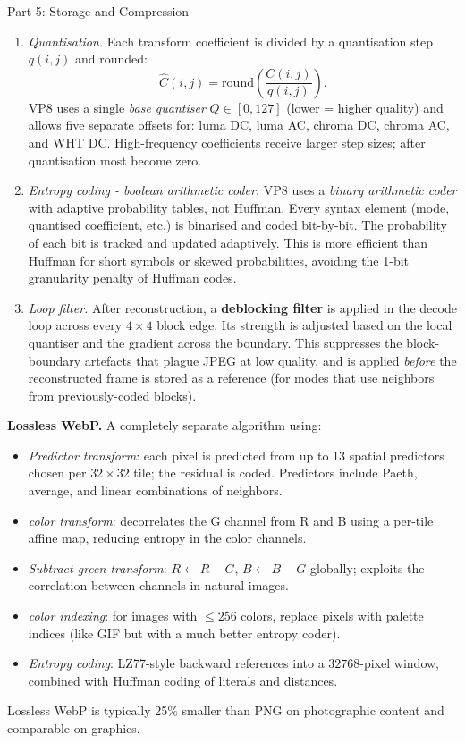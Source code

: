 \documentclass[letterpaper]{article}
\begin{document}
\begin{notes}{Part 5: Storage and Compression}
\begin{enumerate}
    \item \textit{Quantisation.} Each transform coefficient is divided by a quantisation step $q(i,j)$ and rounded:
    $$\hat{C}(i,j) = \mathrm{round}\!\left(\frac{C(i,j)}{q(i,j)}\right).$$
    VP8 uses a single \emph{base quantiser} $Q \in [0, 127]$ (lower = higher quality) and allows five separate offsets for: luma DC, luma AC, chroma DC, chroma AC, and WHT DC. High-frequency coefficients receive larger step sizes; after quantisation most become zero.
    
    \item \textit{Entropy coding - boolean arithmetic coder.} VP8 uses a \emph{binary arithmetic coder} with adaptive probability tables, not Huffman. Every syntax element (mode, quantised coefficient, etc.) is binarised and coded bit-by-bit. The probability of each bit is tracked and updated adaptively. This is more efficient than Huffman for short symbols or skewed probabilities, avoiding the 1-bit granularity penalty of Huffman codes.
    
    \item \textit{Loop filter.} After reconstruction, a \textbf{deblocking filter} is applied in the decode loop across every $4\times4$ block edge. Its strength is adjusted based on the local quantiser and the gradient across the boundary. This suppresses the block-boundary artefacts that plague JPEG at low quality, and is applied \emph{before} the reconstructed frame is stored as a reference (for modes that use neighbors from previously-coded blocks).
\end{enumerate}



\textbf{Lossless WebP.} A completely separate algorithm using:
\begin{itemize}
    \item \emph{Predictor transform}: each pixel is predicted from up to 13 spatial predictors chosen per $32\times32$ tile; the residual is coded. Predictors include Paeth, average, and linear combinations of neighbors.
    \item \emph{color transform}: decorrelates the G channel from R and B using a per-tile affine map, reducing entropy in the color channels.
    \item \emph{Subtract-green transform}: $R \leftarrow R - G$, $B \leftarrow B - G$ globally; exploits the correlation between channels in natural images.
    \item \emph{color indexing}: for images with $\le 256$ colors, replace pixels with palette indices (like GIF but with a much better entropy coder).
    \item \emph{Entropy coding}: LZ77-style backward references into a $32768$-pixel window, combined with Huffman coding of literals and distances.
\end{itemize}
Lossless WebP is typically 25\% smaller than PNG on photographic content and comparable on graphics.\\


\end{notes}
\end{document}
